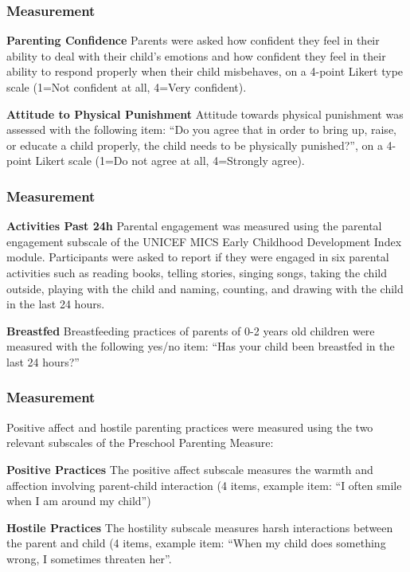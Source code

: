 \documentclass[aspectratio=169]{beamer}
\begin{document}
\begin{frame}
  \frametitle{Measurement}

\textbf{Parenting Confidence}
Parents were asked how confident they feel in their ability to deal with their child’s emotions and how confident they feel in their ability to respond properly when their child misbehaves, on a 4-point Likert type scale (1=Not confident at all, 4=Very confident).  

\textbf{Attitude to Physical Punishment}
Attitude towards physical punishment was assessed with the following item: “Do you agree that in order to bring up, raise, or educate a child properly, the child needs to be physically punished?”, on a 4-point Likert scale (1=Do not agree at all, 4=Strongly agree).  


\end{frame}


\begin{frame}
  \frametitle{Measurement}

\textbf{Activities Past 24h}
Parental engagement was measured using the parental engagement subscale of the UNICEF MICS Early Childhood Development Index module. Participants were asked to report if they were engaged in six parental activities such as reading books, telling stories, singing songs, taking the child outside, playing with the child and naming, counting, and drawing with the child in the last 24 hours. 

\textbf{Breastfed}
Breastfeeding practices of parents of 0-2 years old children were measured with the following yes/no item: “Has your child been breastfed in the last 24 hours?”   

\end{frame}


\begin{frame}
  \frametitle{Measurement}

Positive affect and hostile parenting practices were measured using the two relevant subscales of the Preschool Parenting Measure:

\textbf{Positive Practices}
The positive affect subscale measures the warmth and affection involving parent-child interaction (4 items, example item: “I often smile when I am around my child”)

\textbf{Hostile Practices}
The hostility subscale measures harsh interactions between the parent and child (4 items, example item: “When my child does something wrong, I sometimes threaten her”.


\end{frame}
\end{document}

